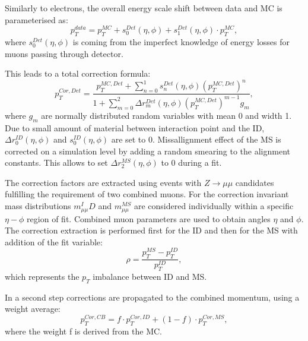 Similarly to electrons, the overall energy scale shift between data and MC is parameterised as:
\begin{equation}
p_T^{data}=p_T^{MC}+s_0^{Det}(\eta, \phi)+s_1^{Det}(\eta, \phi) \cdot p_T^{MC},
\end{equation}
where $s_0^{Det}(\eta, \phi)$ is coming from the imperfect knowledge of energy losses for muons passing through detector. 

This leads to a total correction formula:
\begin{equation}
p^{Cor,Det}_T=\frac{p_{T}^{MC,Det}+\sum\limits_{n=0}^1 s_n^{Det}(\eta, \phi)(p_T^{MC,Det})^n}{1+\sum\limits_{m=0}^2 \Delta r_m^{Det}(\eta, \phi)(p_T^{MC,Det})^{m-1} g_m},
\end{equation}
where $g_m$ are normally distributed random variables with mean 0 and width 1. Due to small amount of material between interaction point and the ID, $\Delta r^{ID}_0(\eta, \phi)$ and $s_0^{ID}(\eta, \phi)$ are set to 0. Missallignment effect of the MS is corrected on a simulation level by adding a random smearing to the alignment constants. This allows to set $\Delta r^{MS}_2(\eta, \phi)$ to 0 during a fit. 

The correction factors are extracted using events with $Z \to \mu \mu$ candidates fulfilling the requirement of two combined muons. For the correction invariant mass distributions $m_{\mu\mu}^ID$ and $m_{\mu\mu}^{MS}$ are considered individually within a specific $\eta - \phi$ region of fit. Combined muon parameters are used to obtain angles $\eta$ and $\phi$. 
The correction extraction is performed first for the ID and then for the MS with addition of the fit variable:
\begin{equation}
\rho = \frac{p_T^{MS}-p_T^{ID}}{p_T^{ID}},
\end{equation}
which represents the $p_T$ imbalance between ID and MS. 

In a second step corrections are propagated to the combined momentum, using a weight average:
\begin{equation}
p_T^{Cor,CB}= f\cdot p_T^{Cor,ID}+(1-f) \cdot p_T^{Cor,MS},
\end{equation}
where the weight f is derived from the MC. 
